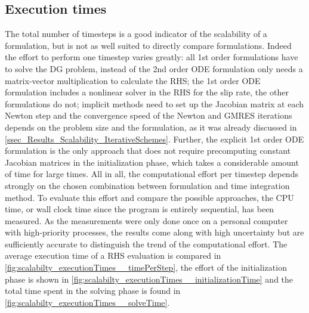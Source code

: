 \subsection{Execution times}
The total number of timesteps is a good indicator of the scalability of a formulation, but is not as well suited to directly compare formulations. Indeed the effort to perform one timestep varies greatly: all 1st order formulations have to solve the DG problem, instead of the 2nd order ODE formulation only needs a matrix-vector multiplication to calculate the RHS; the 1st order ODE formulation includes a nonlinear solver in the RHS for the slip rate, the other formulations do not; implicit methods need to set up the Jacobian matrix at each Newton step and the convergence speed of the Newton and GMRES iterations depends on the problem size and the formulation, as it was already discussed in \autoref{ssec_Results_Scalability_IterativeSchemes}. Further, the explicit 1st order ODE formulation is the only approach that does not require precomputing constant Jacobian matrices in the initialization phase, which takes a considerable amount of time for large times. All in all, the computational effort per timestep depends strongly on the chosen combination between formulation and time integration method. To evaluate this effort and compare the possible approaches, the CPU time, or wall clock time since the program is entirely sequential, has been measured. As the measurements were only done once on a personal computer with high-priority processes, the results come along with high uncertainty but are sufficiently accurate to distinguish the trend of the computational effort. The average execution time of a RHS evaluation is compared in \autoref{fig:scalabilty_executionTimes__timePerStep}, the effort of the initialization phase is shown in \autoref{fig:scalabilty_executionTimes__initializationTime} and the total time spent in the solving phase is found in \autoref{fig:scalabilty_executionTimes__solveTime}.

